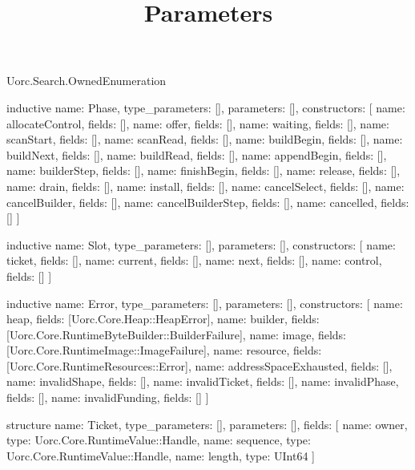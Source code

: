 \begin{lexlean}{Uorc.Search.OwnedEnumeration}
\title{Parameters}
\begin{semanticmodule}
inductive{
  name: Phase,
  type_parameters: [],
  parameters: [],
  constructors: [
    {name: allocateControl, fields: []},
    {name: offer, fields: []},
    {name: waiting, fields: []},
    {name: scanStart, fields: []},
    {name: scanRead, fields: []},
    {name: buildBegin, fields: []},
    {name: buildNext, fields: []},
    {name: buildRead, fields: []},
    {name: appendBegin, fields: []},
    {name: builderStep, fields: []},
    {name: finishBegin, fields: []},
    {name: release, fields: []},
    {name: drain, fields: []},
    {name: install, fields: []},
    {name: cancelSelect, fields: []},
    {name: cancelBuilder, fields: []},
    {name: cancelBuilderStep, fields: []},
    {name: cancelled, fields: []}
  ]
}

inductive{
  name: Slot,
  type_parameters: [],
  parameters: [],
  constructors: [
    {name: ticket, fields: []},
    {name: current, fields: []},
    {name: next, fields: []},
    {name: control, fields: []}
  ]
}

inductive{
  name: Error,
  type_parameters: [],
  parameters: [],
  constructors: [
    {name: heap, fields: [Uorc.Core.Heap::HeapError]},
    {name: builder, fields: [Uorc.Core.RuntimeByteBuilder::BuilderFailure]},
    {name: image, fields: [Uorc.Core.RuntimeImage::ImageFailure]},
    {name: resource, fields: [Uorc.Core.RuntimeResources::Error]},
    {name: addressSpaceExhausted, fields: []},
    {name: invalidShape, fields: []},
    {name: invalidTicket, fields: []},
    {name: invalidPhase, fields: []},
    {name: invalidFunding, fields: []}
  ]
}

structure{
  name: Ticket,
  type_parameters: [],
  parameters: [],
  fields: [
    {name: owner, type: Uorc.Core.RuntimeValue::Handle},
    {name: sequence, type: Uorc.Core.RuntimeValue::Handle},
    {name: length, type: UInt64}
  ]
}


\end{semanticmodule}
\end{lexlean}
